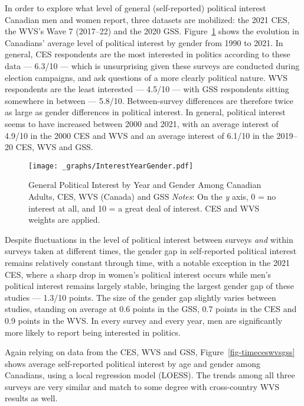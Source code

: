 \documentclass[
  letterpaper,
  DIV=11,
  numbers=noendperiod]{scrreprt}
\begin{document}
In order to explore what level of general (self-reported) political
interest Canadian men and women report, three datasets are mobilized:
the 2021 CES, the WVS's Wave 7 (2017--22) and the 2020 GSS.
Figure~\ref{fig-yeargender} shows the evolution in Canadians' average
level of political interest by gender from 1990 to 2021. In general, CES
respondents are the most interested in politics according to these data
--- 6.3/10 --- which is unsurprising given these surveys are conducted
during election campaigns, and ask questions of a more clearly political
nature. WVS respondents are the least interested --- 4.5/10 --- with GSS
respondents sitting somewhere in between --- 5.8/10. Between-survey
differences are therefore twice as large as gender differences in
political interest. In general, political interest seems to have
increased between 2000 and 2021, with an average interest of 4.9/10 in
the 2000 CES and WVS and an average interest of 6.1/10 in the 2019--20
CES, WVS and GSS.

\begin{figure}

{\centering \texttt{[image: \_graphs/InterestYearGender.pdf]}

}

\caption{\label{fig-yeargender}General Political Interest by Year and
Gender Among Canadian Adults, CES, WVS (Canada) and GSS
\newline \textit{Notes}: On the \textit{y} axis, 0 = no interest at all,
and 10 = a great deal of interest. CES and WVS weights are applied.}

\end{figure}

Despite fluctuations in the level of political interest between surveys
\emph{and} within surveys taken at different times, the gender gap in
self-reported political interest remains relatively constant through
time, with a notable exception in the 2021 CES, where a sharp drop in
women's political interest occurs while men's political interest remains
largely stable, bringing the largest gender gap of these studies ---
1.3/10 points. The size of the gender gap slightly varies between
studies, standing on average at 0.6 points in the GSS, 0.7 points in the
CES and 0.9 points in the WVS. In every survey and every year, men are
significantly more likely to report being interested in politics.

Again relying on data from the CES, WVS and GSS,
Figure~\ref{fig-timeceswvsgss} shows average self-reported political
interest by age and gender among Canadians, using a local regression
model (LOESS). The trends among all three surveys are very similar and
match to some degree with cross-country WVS results as well.
\end{document}

